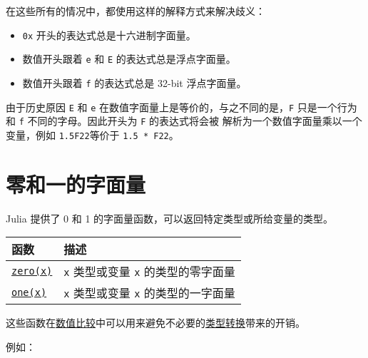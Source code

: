 在这些所有的情况中，都使用这样的解释方式来解决歧义：



\begin{itemize}
\item \texttt{0x} 开头的表达式总是十六进制字面量。


\item 数值开头跟着 \texttt{e} 和 \texttt{E} 的表达式总是浮点字面量。


\item 数值开头跟着 \texttt{f} 的表达式总是 32-bit 浮点字面量。

\end{itemize}


由于历史原因 \texttt{E} 和 \texttt{e} 在数值字面量上是等价的，与之不同的是，\texttt{F} 只是一个行为和 \texttt{f} 不同的字母。因此开头为 \texttt{F} 的表达式将会被 解析为一个数值字面量乘以一个变量，例如 \texttt{1.5F22}等价于 \texttt{1.5 * F22}。



\hypertarget{15171481192117197140}{}


\section{零和一的字面量}



Julia 提供了 0 和 1 的字面量函数，可以返回特定类型或所给变量的类型。




\begin{table}[h]

\begin{tabulary}{\linewidth}{|L|L|}
\hline
函数 & 描述 \\
\hline
\hyperlink{240596739242881814}{\texttt{zero(x)}} & \texttt{x} 类型或变量 \texttt{x} 的类型的零字面量 \\
\hline
\hyperlink{11395333326208453101}{\texttt{one(x)}} & \texttt{x} 类型或变量 \texttt{x} 的类型的一字面量 \\
\hline
\end{tabulary}

\end{table}



这些函数在\hyperlink{7125151170457482788}{数值比较}中可以用来避免不必要的\hyperlink{10374023657104680331}{类型转换}带来的开销。



例如：




